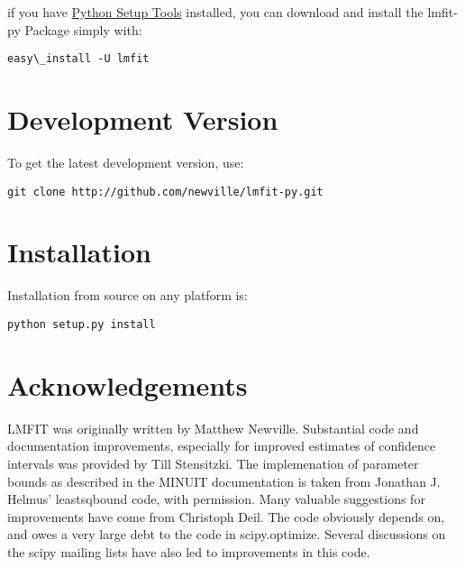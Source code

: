 \documentclass[letterpaper,10pt,english]{sphinxmanual}
\begin{document}
if you have \href{http://pypi.python.org/pypi/setuptools}{Python Setup Tools}  installed, you can download and install
the lmfit-py Package simply with:

\begin{Verbatim}[commandchars=\\\{\}]
easy\_install -U lmfit
\end{Verbatim}


\section{Development Version}
\label{installation:development-version}
To get the latest development version, use:

\begin{Verbatim}[commandchars=\\\{\}]
git clone http://github.com/newville/lmfit-py.git
\end{Verbatim}


\section{Installation}
\label{installation:installation}
Installation from source on any platform is:

\begin{Verbatim}[commandchars=\\\{\}]
python setup.py install
\end{Verbatim}


\section{Acknowledgements}
\label{installation:acknowledgements}
LMFIT was originally written by Matthew Newville.  Substantial code and
documentation improvements, especially for improved estimates of confidence
intervals was provided by Till Stensitzki.  The implemenation of parameter
bounds as described in the MINUIT documentation is taken from Jonathan
J. Helmus' leastsqbound code, with permission. Many valuable suggestions
for improvements have come from Christoph Deil.  The code obviously depends
on, and owes a very large debt to the code in scipy.optimize.  Several
discussions on the scipy mailing lists have also led to improvements in
this code.
\end{document}
